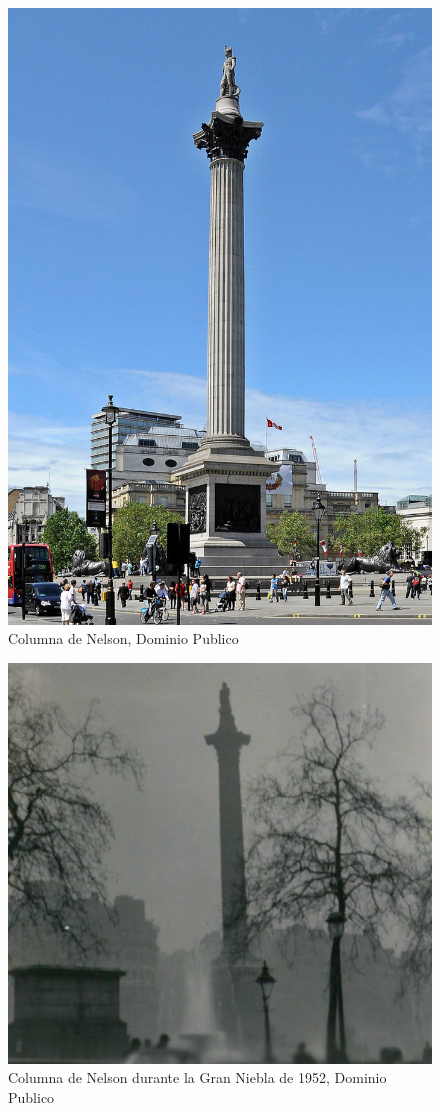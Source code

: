 \documentclass[]{book}
\begin{document}
\begin{figure}
\includegraphics[width=0.9\linewidth,height=0.9\textheight]{figs/800px-Nelson's_Column,_Trafalgar_Square,_London} \caption{Columna de Nelson, Dominio Publico}\label{fig:unnamed-chunk-5}
\end{figure}

\begin{figure}
\centering
\includegraphics{figs/Nelson's_Column_during_the_Great_Smog_of_1952.jpg}
\caption{\label{fig:unnamed-chunk-6}Columna de Nelson durante la Gran Niebla de 1952, Dominio Publico}
\end{figure}
\end{document}
